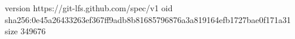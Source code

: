 version https://git-lfs.github.com/spec/v1
oid sha256:0e45a26433263ef367ff9adb8b81685796876a3a819164efb1727bae0f171a31
size 349676
